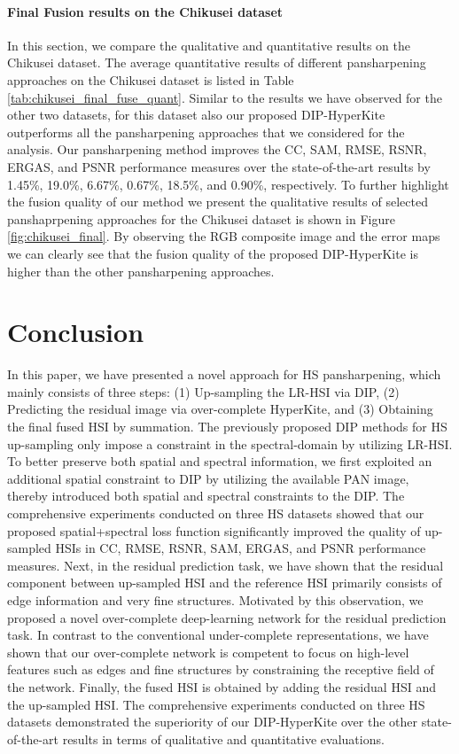 \documentclass[journal]{IEEEtran}
\begin{document}
    \paragraph{Final Fusion results on the Chikusei dataset} 
    In this section, we compare the qualitative and quantitative results on the Chikusei dataset. The average quantitative results of different pansharpening approaches on the Chikusei dataset is listed in Table \ref{tab:chikusei_final_fuse_quant}. Similar to the results we have observed for the other two datasets, for this dataset also our proposed DIP-HyperKite outperforms all the pansharpening approaches that we considered for the analysis. Our pansharpening  method improves the CC, SAM, RMSE, RSNR, ERGAS, and PSNR performance measures over the state-of-the-art results by 1.45\%, 19.0\%, 6.67\%, 0.67\%, 18.5\%, and 0.90\%, respectively. To further highlight the fusion quality of our method we present the qualitative results of selected panshaprpening approaches for the Chikusei dataset is shown in Figure \ref{fig:chikusei_final}. By observing the RGB composite image and the error maps we can clearly see that the fusion quality of the proposed DIP-HyperKite is higher than the other pansharpening approaches.

\section{Conclusion}
\label{sec: conclusion}
    In this paper, we have presented a novel approach for HS pansharpening, which mainly consists of three steps: (1) Up-sampling the LR-HSI via DIP, (2) Predicting the residual image via over-complete HyperKite, and (3) Obtaining the final fused HSI by summation. The previously proposed DIP methods for HS up-sampling only impose a constraint in the spectral-domain  by utilizing LR-HSI. To better preserve both spatial and spectral information, we first exploited an additional spatial constraint to DIP by utilizing the available PAN image, thereby introduced both spatial and spectral constraints to the DIP. The comprehensive experiments conducted on three HS datasets showed that our proposed spatial+spectral loss function significantly improved the quality of up-sampled HSIs in CC, RMSE, RSNR, SAM, ERGAS, and PSNR performance measures. Next, in the residual prediction task, we have shown that the residual component between  up-sampled HSI and the reference HSI primarily consists of edge information and very fine structures. Motivated by this observation, we proposed a novel over-complete deep-learning network for the residual prediction task. In contrast to the conventional under-complete representations, we have shown that our over-complete network is competent to focus on high-level features such as edges and fine structures by constraining the receptive field of the network. Finally, the fused HSI is obtained by adding the residual HSI and the up-sampled HSI. The comprehensive experiments conducted on three HS datasets demonstrated the superiority of our DIP-HyperKite over the other state-of-the-art results in terms of qualitative and quantitative evaluations.
    
\end{document}
